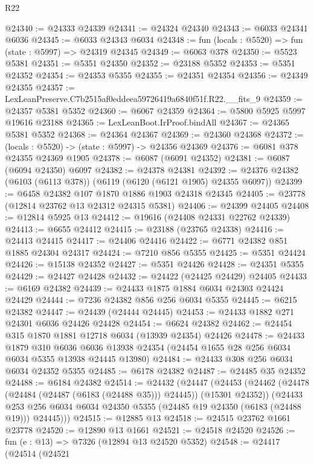 \begin{lexlean}{R22}
\begin{coremodule}
@24340 := @24333 @24339
@24341 := @24324 @24340
@24343 := @6033 @24341 @6036
@24345 := @6033 @24343 @6034
@24348 := fun (locals : @5520) => fun (state : @5997) => @24319 @24345
@24349 := @6063 @378
@24350 := @5523 @5381
@24351 := @5351 @24350
@24352 := @23188 @5352
@24353 := @5351 @24352
@24354 := @24353 @5355
@24355 := @24351 @24354
@24356 := @24349 @24355
@24357 := LexLeanPreserve.C7b2515af0eddeea59726419a6840f51f.R22.__fits_9
@24359 := @24357 @5381 @5352
@24360 := @6067 @24359
@24364 := @5800 @5925 @5997 @19616 @23188
@24365 := LexLeanBoot.IrProof.bindAll
@24367 := @24365 @5381 @5352
@24368 := @24364 @24367
@24369 := @24360 @24368
@24372 := (locals : @5520) -> (state : @5997) -> @24356 @24369
@24376 := @6081 @378 @24355 @24369 @1905
@24378 := @6087 (@6091 @24352)
@24381 := @6087 (@6094 @24350) @6097
@24382 := @24378 @24381
@24392 := @24376 @24382 (@6103 (@6113 @378)) (@6119 (@6120 (@6121 @1905) @24355 @6097))
@24399 := @6458 @24382 @107 @1870 @1886 @1903 @24318 @24345
@24405 := @23778 (@12814 @23762 @13 @24312 @24315 @5381)
@24406 := @24399 @24405
@24408 := @12814 @5925 @13
@24412 := @19616 (@24408 @24331 @22762 @24339)
@24413 := @6655 @24412
@24415 := @23188 (@23765 @24338)
@24416 := @24413 @24415
@24417 := @24406 @24416
@24422 := @6771 @24382 @851 @1885 @24304 @24317
@24424 := @7210 @856 @5355
@24425 := @5351 @24424
@24426 := @15138 @24352
@24427 := @5351 @24426
@24428 := @24351 @5355
@24429 := @24427 @24428
@24432 := @24422 (@24425 @24429) @24405
@24433 := @6169 @24382
@24439 := @24433 @1875 @1884 @6034 @24303 @24424 @24429
@24444 := @7236 @24382 @856 @256 @6034 @5355
@24445 := @6215 @24382
@24447 := @24439 (@24444 @24445)
@24453 := @24433 @1882 @271 @24301 @6036 @24426 @24428
@24454 := @6624 @24382
@24462 := @24454 @315 @1870 @1881 @12718 @6034 (@13939 @24354) @24426
@24478 := @24433
    @1879
    @310
    @6036
    @6036
    @13938
    @24354
    (@24454 @1655 @28 @256 @6034 @6034 @5355 @13938 @24445 @13980)
@24484 := @24433 @308 @256 @6034 @6034 @24352 @5355
@24485 := @6178 @24382
@24487 := @24485 @35 @24352
@24488 := @6184 @24382
@24514 := @24432
    (@24447
      (@24453
        (@24462 (@24478 (@24484 (@24487 (@6183 (@24488 @35))) @24445)) (@15301 @24352))
        (@24433
          @253
          @256
          @6034
          @6034
          @24350
          @5355
          (@24485 @19 @24350 (@6183 (@24488 @19)))
          @24445)))
@24515 := @12885 @13
@24518 := @24515 @23762 @1661 @23778
@24520 := @12890 @13 @1661
@24521 := @24518 @24520
@24526 := fun (e : @13) => @7326 (@12894 @13 @24520 @5352)
@24548 := @24417
    (@24514
      (@24521

\end{coremodule}
\end{lexlean}
